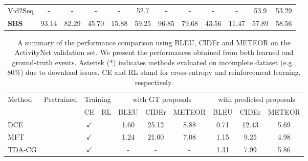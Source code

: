 \begin{sidewaystable}
\begin{tabular}{@{}l|ccccc|ccccc|c@{}}
    Vid2Seq \cite{yang2023vid2seq} & -                                    & -                                       & -                   & -     & 52.7    & -     & -     & -     & -     & 53.9    & 53.29 \\
    \textbf{SBS}                   & 93.14                                & 82.29                                   & 45.70               & 15.88 & 59.25   & 96.85 & 79.68 & 43.56 & 11.47 & 57.89   & 58.56 \\
    \hline
  \end{tabular}
  \label{tab:eval_event_localizer}
\end{sidewaystable}

\begin{sidewaystable}
  \centering
  \caption{
    A summary of the performance comparison using BLEU, CIDEr and METEOR on the ActivityNet validation set.
    We present the performances obtained from both learned and ground-truth events.
    Asterisk (*) indicates methods evaluated on incomplete dataset (e.g., 80\%) due to download issues.
    CE and RL stand for cross-entropy and reinforcement learning, respectively.
  }
  \begin{tabular}{@{}l|c|cc|ccc|ccc@{}}
    \hline
    \multirow{2}{*}{Method}             & \multirow{2}{*}{Pretrained} & \multicolumn{2}{|c|}{Training} & \multicolumn{3}{|c|}{with GT proposals} & \multicolumn{3}{c}{with predicted proposals}                                                 \\
                                        &                             & CE                             & RL                                      & BLEU                                         & CIDEr   & METEOR  & BLEU   & CIDEr   & METEOR \\
    \hline
    DCE \cite{krishna2017dense}         &                             & $\checkmark$                   &                                         & 1.60                                         & 25.12   & 8.88    & 0.71   & 12.43   & 5.69   \\
    MFT \cite{xiong2018move}            &                             & $\checkmark$                   &                                         & 1.24                                         & 21.00   & 7.08    & 1.15   & 9.25    & 4.98   \\
    TDA-CG \cite{wang2018bidirectional} &                             & $\checkmark$                   &                                         & -                                            & -       & -       & 1.31   & 7.99    & 5.86   \\

\end{tabular}
\end{sidewaystable}
